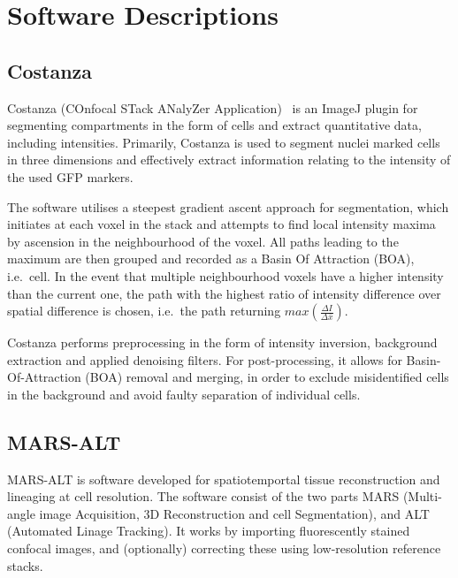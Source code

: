 
\ifpdf
\graphicspath{{Appendix3/Figs/Raster/}{Appendix3/Figs/PDF/}{Appendix3/Figs/}}
\else
\graphicspath{{Appendix3/Figs/Vector/}{Appendix3/Figs/}}
\fi
\chapter{Software Descriptions}
\label{sec:software_descr}

\section{Costanza}
\label{sec:costanza}
Costanza (COnfocal STack ANalyZer Application)~\cite{costanza} is an ImageJ plugin for
segmenting compartments in the form of cells and extract quantitative data,
including intensities. Primarily, Costanza is used to segment nuclei marked
cells in three dimensions and effectively extract information relating to the
intensity of the used GFP markers.

The software utilises a steepest gradient ascent approach for segmentation, which
initiates at each voxel in the stack and attempts to find local intensity maxima
by ascension in the neighbourhood of the voxel. All paths leading to the maximum
are then grouped and recorded as a Basin Of Attraction (BOA), i.e.\ cell. In the event that
multiple neighbourhood voxels have a higher intensity than the current one, the
path with the highest ratio of intensity difference over spatial difference is
chosen, i.e.\ the path returning $max\left( \frac{\Delta I}{\Delta \bar x} \right)$.

Costanza performs preprocessing in the form
of intensity inversion, background extraction and applied denoising filters. 
For post-processing, it allows for Basin-Of-Attraction (BOA) removal and merging, in
order to exclude misidentified cells in the background and avoid faulty
separation of individual cells. 


\section{MARS-ALT}
\label{sec:marsalt}
MARS-ALT is software developed for spatiotemportal tissue reconstruction and lineaging at cell
resolution. The software consist of the two parts MARS (Multi-angle image
Acquisition, 3D Reconstruction and cell Segmentation), and ALT (Automated Linage
Tracking). It works by importing fluorescently stained confocal images, and
(optionally) correcting these using low-resolution reference stacks. 

